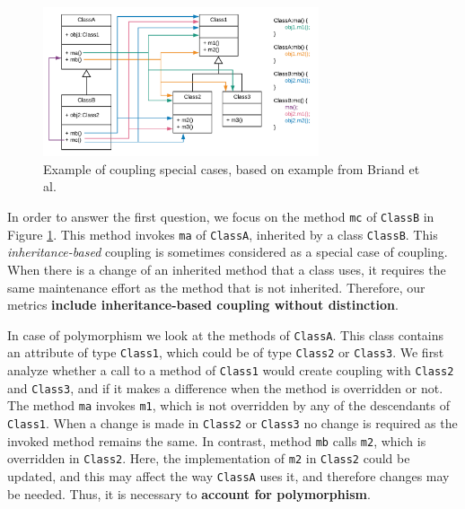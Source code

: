 \documentclass[a4paper]{article}
\begin{document}
\begin{figure}[ht]
\begin{center}
\includegraphics[height=4.4cm]{img/specialcases.png}
\caption{Example of coupling special cases, based on example from Briand et al. \cite{briand1999unified}}
\label{fig:specialcases}
\end{center}
\end{figure}

In order to answer the first question, we focus on the method \texttt{mc} of \texttt{ClassB} in Figure \ref{fig:specialcases}. This method invokes \texttt{ma} of \texttt{ClassA}, inherited by a class \texttt{ClassB}.
This %
{\em inheritance-based} coupling is sometimes considered as a special case of coupling. %
When there is a change of an inherited method that a class uses, it  requires the same maintenance effort as the method that is not inherited. Therefore, our metrics  \textbf{include inheritance-based coupling without distinction}.

In case of polymorphism we look at the methods of \texttt{ClassA}. This class contains an attribute of type \texttt{Class1},
which could be of type \texttt{Class2} or \texttt{Class3}.
We first analyze whether a call to a method of \texttt{Class1} would create coupling with \texttt{Class2} and \texttt{Class3}, and if it makes a difference when the method is overridden or not. The method \texttt{ma} invokes \texttt{m1}, which is not overridden by any of the descendants of \texttt{Class1}. When a change is made in \texttt{Class2} or \texttt{Class3} no change is required as the invoked method remains the same. In contrast, method \texttt{mb} calls \texttt{m2}, which is overridden in \texttt{Class2}. Here, the implementation of \texttt{m2} in \texttt{Class2} could be updated, and this may affect the way \texttt{ClassA} uses it, and therefore changes may be needed. Thus, %
it is necessary to \textbf{account for polymorphism}.
\end{document}
